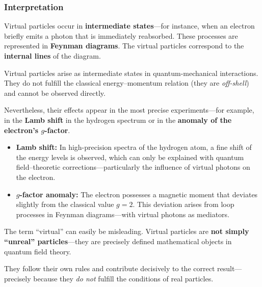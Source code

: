 \subsubsection*{Interpretation}

Virtual particles occur in \textbf{intermediate states}—for instance, when an electron briefly emits a photon that is immediately reabsorbed.
These processes are represented in \textbf{Feynman diagrams}. The virtual particles correspond to the \textbf{internal lines} of the diagram.

\vspace{1em}
\begin{tcolorbox}[physikbox, title=Virtual Particles in the Quantum Vacuum, label=box:virtuelle-teilchen]
	\label{box:virtuelle-teilchen}
	Virtual particles arise as intermediate states in quantum-mechanical interactions. They do not fulfill the classical energy–momentum relation (they are \emph{off-shell}) and cannot be observed directly.
	
	Nevertheless, their effects appear in the most precise experiments—for example, in the \textbf{Lamb shift} in the hydrogen spectrum or in the \textbf{anomaly of the electron’s $g$-factor}.
\end{tcolorbox}

\vspace{1em}
\begin{tcolorbox}[hinweisbox, title=Indirect Evidence for Virtual Photons]
	\label{box:Nachweis virtueller Photonen}
	\small
	\begin{itemize}
		\item \textbf{Lamb shift:} In high-precision spectra of the hydrogen atom, a fine shift of the energy levels is observed, which can only be explained with quantum field–theoretic corrections—particularly the influence of virtual photons on the electron.
		\item \textbf{$g$-factor anomaly:} The electron possesses a magnetic moment that deviates slightly from the classical value $g = 2$. This deviation arises from loop processes in Feynman diagrams—with virtual photons as mediators.
	\end{itemize}
\end{tcolorbox}

\vspace{1em}
\begin{tcolorbox}[didaktikbox, title=Does Virtual Mean Less Real?, label=box:virtuell-denkfehler]
	\label{box:virtuell-denkfehler}
	The term “virtual” can easily be misleading. Virtual particles are \textbf{not simply “unreal” particles}—they are precisely defined mathematical objects in quantum field theory.
	
	They follow their own rules and contribute decisively to the correct result—precisely because they \emph{do not} fulfill the conditions of real particles.
\end{tcolorbox}
